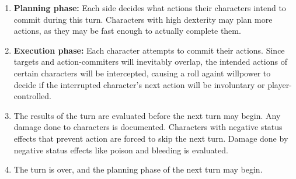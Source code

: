 \documentclass[tikz,openany,11pt,a4paper]{book}
\begin{document}
\begin{enumerate}
  \item \textbf{Planning phase:} Each side decides what actions their characters intend to commit during this turn. Characters with high dexterity may plan more actions, as they may be fast enough to actually complete them.
  \item \textbf{Execution phase:} Each character attempts to commit their actions. Since targets and action-commiters will inevitably overlap, the intended actions of certain characters will be intercepted, causing a roll againt willpower to decide if the interrupted character's next action will be involuntary or player-controlled.
  \item The results of the turn are evaluated before the next turn may begin. Any damage done to characters is documented. Characters with negative status effects that prevent action are forced to skip the next turn. Damage done by negative status effects like poison and bleeding is evaluated.
  \item The turn is over, and the planning phase of the next turn may begin.
\end{enumerate}
\end{document}
